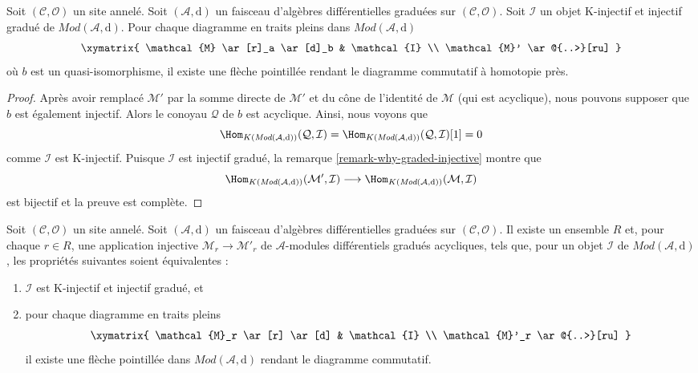 \begin{lemma}
\label{lemma-second-property-dg-injective}
Soit $(\mathcal{C}, \mathcal{O})$ un site annelé.
Soit $(\mathcal{A}, \text{d})$ un faisceau d'algèbres différentielles graduées sur $(\mathcal{C}, \mathcal{O})$.
Soit $\mathcal{I}$ un objet K-injectif et injectif gradué de $\textit{Mod}(\mathcal{A}, \text{d})$.
Pour chaque diagramme en traits pleins dans $\textit{Mod}(\mathcal{A}, \text{d})$
$$
\xymatrix{
\mathcal{M} \ar[r]_a \ar[d]_b & \mathcal{I} \\
\mathcal{M}' \ar@{..>}[ru]
}
$$
où $b$ est un quasi-isomorphisme, il existe une flèche pointillée rendant le diagramme commutatif à homotopie près.
\end{lemma}

\begin{proof}
Après avoir remplacé $\mathcal{M}'$ par la somme directe de $\mathcal{M}'$ et du cône de l'identité de $\mathcal{M}$ (qui est acyclique), nous pouvons supposer que $b$ est également injectif.
Alors le conoyau $\mathcal{Q}$ de $b$ est acyclique.
Ainsi, nous voyons que
$$
\Hom_{K(\textit{Mod}(\mathcal{A}, \text{d}))}(\mathcal{Q}, \mathcal{I}) =
\Hom_{K(\textit{Mod}(\mathcal{A}, \text{d}))}(\mathcal{Q}, \mathcal{I})[1] = 0
$$
comme $\mathcal{I}$ est K-injectif.
Puisque $\mathcal{I}$ est injectif gradué, la remarque \ref{remark-why-graded-injective} montre que
$$
\Hom_{K(\textit{Mod}(\mathcal{A}, \text{d}))}(\mathcal{M}', \mathcal{I})
\longrightarrow
\Hom_{K(\textit{Mod}(\mathcal{A}, \text{d}))}(\mathcal{M}, \mathcal{I})
$$
est bijectif et la preuve est complète.
\end{proof}

\begin{lemma}
\label{lemma-better-set-of-monos}
Soit $(\mathcal{C}, \mathcal{O})$ un site annelé.
Soit $(\mathcal{A}, \text{d})$ un faisceau d'algèbres différentielles graduées sur $(\mathcal{C}, \mathcal{O})$.
Il existe un ensemble $R$ et, pour chaque $r \in R$, une application injective $\mathcal{M}_r \to \mathcal{M}'_r$ de $\mathcal{A}$-modules différentiels gradués acycliques, tels que, pour un objet $\mathcal{I}$ de $\textit{Mod}(\mathcal{A}, \text{d})$, les propriétés suivantes soient équivalentes :
\begin{enumerate}
\item $\mathcal{I}$ est K-injectif et injectif gradué, et \item pour chaque diagramme en traits pleins
$$
\xymatrix{
\mathcal{M}_r \ar[r] \ar[d] & \mathcal{I} \\
\mathcal{M}'_r \ar@{..>}[ru]
}
$$
il existe une flèche pointillée dans $\textit{Mod}(\mathcal{A}, \text{d})$ rendant le diagramme commutatif.
\end{enumerate}
\end{lemma}

